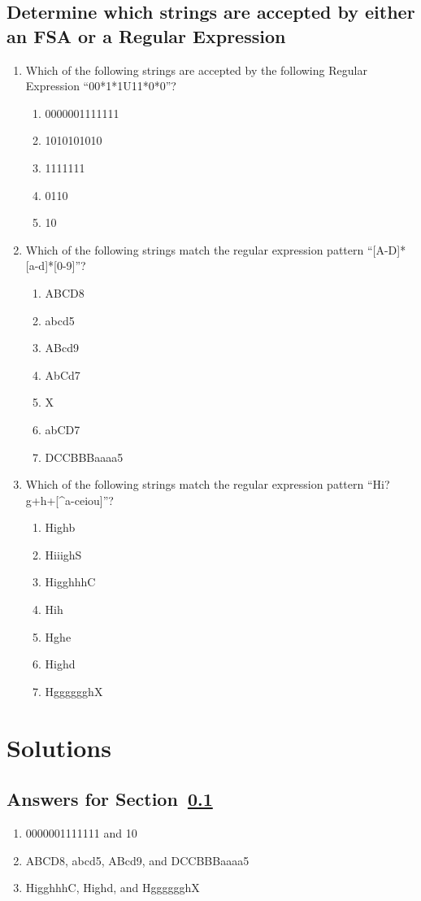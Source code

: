 \documentclass[10pt]{article}
\begin{document}
\subsection{Determine which strings are accepted by either an FSA or a Regular Expression}
\label{par:accepted}
\begin{enumerate}
\item Which of the following strings are accepted by the following Regular Expression     ``00*1*1U11*0*0''?
    \begin{enumerate}
    \item 0000001111111
    \item 1010101010
    \item 1111111
    \item 0110
    \item 10
    \end{enumerate}
\item Which of the following strings match the regular expression
pattern ``[A-D]*[a-d]*[0-9]''?
    \begin{enumerate}
    \item ABCD8
    \item abcd5
    \item ABcd9
    \item AbCd7
    \item X
    \item abCD7
    \item DCCBBBaaaa5
    \end{enumerate}
\item Which of the following strings match the regular expression
pattern ``Hi?g+h+[\string^a-ceiou]''?
    \begin{enumerate}
    \item Highb
    \item HiiighS
    \item HigghhhC
    \item Hih
    \item Hghe
    \item Highd
    \item HgggggghX
    \end{enumerate}
\end{enumerate}

\section{Solutions}

\subsection{Answers for Section~\ref{par:accepted}}
\begin{enumerate}
\item 0000001111111 and 10
\item ABCD8, abcd5, ABcd9, and DCCBBBaaaa5
\item HigghhhC, Highd, and HgggggghX
\end{enumerate}

\end{document}
